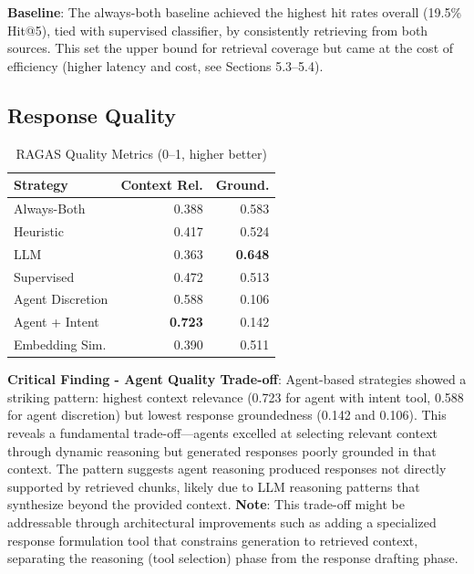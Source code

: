 \documentclass[twocolumn,10pt]{article}
\begin{document}
\textbf{Baseline}: The always-both baseline achieved the highest hit rates overall (19.5\% Hit@5), tied with supervised classifier, by consistently retrieving from both sources. This set the upper bound for retrieval coverage but came at the cost of efficiency (higher latency and cost, see Sections 5.3--5.4).

\subsection{Response Quality}

\begin{table}[h]
\centering
\caption{RAGAS Quality Metrics (0--1, higher better)}
\small
\begin{tabular}{lrr}
\toprule
Strategy & Context Rel. & Ground. \\
\midrule
Always-Both & 0.388 & 0.583 \\
Heuristic & 0.417 & 0.524 \\
LLM & 0.363 & \textbf{0.648} \\
Supervised & 0.472 & 0.513 \\
Agent Discretion & 0.588 & 0.106 \\
Agent + Intent & \textbf{0.723} & 0.142 \\
Embedding Sim. & 0.390 & 0.511 \\
\bottomrule
\end{tabular}
\end{table}

\textbf{Critical Finding - Agent Quality Trade-off}: Agent-based strategies showed a striking pattern: highest context relevance (0.723 for agent with intent tool, 0.588 for agent discretion) but lowest response groundedness (0.142 and 0.106). This reveals a fundamental trade-off---agents excelled at selecting relevant context through dynamic reasoning but generated responses poorly grounded in that context. The pattern suggests agent reasoning produced responses not directly supported by retrieved chunks, likely due to LLM reasoning patterns that synthesize beyond the provided context. \textbf{Note}: This trade-off might be addressable through architectural improvements such as adding a specialized response formulation tool that constrains generation to retrieved context, separating the reasoning (tool selection) phase from the response drafting phase.
\end{document}
